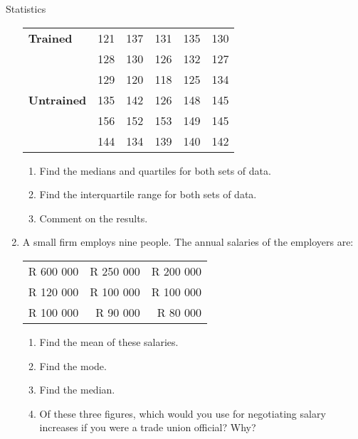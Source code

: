 \begin{eocexercises}{Statistics}
\begin{enumerate}
    \begin{center}
      \begin{tabular}{lccccc}
        \toprule
        \textbf{Trained} & 121 & 137 & 131 & 135 & 130 \\
                         & 128 & 130 & 126 & 132 & 127 \\
                         & 129 & 120 & 118 & 125 & 134 \\
        \midrule
        \textbf{Untrained} & 135 & 142 & 126 & 148 & 145 \\
                           & 156 & 152 & 153 & 149 & 145 \\
                           & 144 & 134 & 139 & 140 & 142 \\
        \bottomrule
      \end{tabular}
    \end{center}
    \begin{enumerate}
    \item Find the medians and quartiles for both sets of data.
    \item Find the interquartile range for both sets of data.
    \item Comment on the results.
    \end{enumerate}

  \item A small firm employs nine people. The annual salaries of the employers are:
    \begin{center}
      \begin{tabular}{rrr}
        \toprule
        R 600 000 & R 250 000 & R 200 000 \\
        R 120 000 & R 100 000 & R 100 000 \\
        R 100 000 & R  90 000 & R  80 000 \\
        \bottomrule
      \end{tabular}
    \end{center}
    \begin{enumerate}
    \item Find the mean of these salaries.
    \item Find the mode.
    \item Find the median.
    \item Of these three figures, which would you use for
      negotiating salary increases if you were a trade union
      official? Why?
    \end{enumerate}

  \end{enumerate}
\end{eocexercises}
